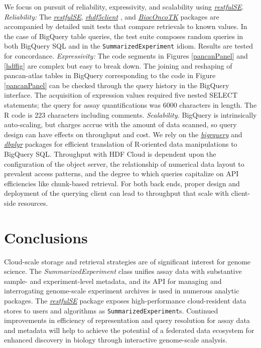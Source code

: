 \documentclass[applications]{gen-bioinformatics}
\newcommand{\Biocpackage}[1]{{\emph{\href{https://bioconductor.org/packages/3.8/#1}{#1}}}}
\newcommand{\CRANpackage}[1]{{\emph{\href{https://cran.r-project.org/web/packages/#1/index.html}{#1}}}}
\newcommand{\Rclass}[1]{{\textit{#1}}}
\begin{document}
We focus on pursuit of reliability,
expressivity, and scalability using \Biocpackage{restfulSE}.  
\textit{Reliability:} 
The \Biocpackage{restfulSE}, \Biocpackage{rhdf5client} \citep{rclient},
and \Biocpackage{BiocOncoTK} \citep{bionc} packages are accompanied by detailed unit
tests that compare retrievals to known values.  In the
case of BigQuery table queries, the test
suite composes random queries 
in both BigQuery SQL and in the \texttt{SummarizedExperiment} 
idiom.  Results
are tested for concordance.  \textit{Expressivity:} The code
segments in Figures \ref{pancanPanel} and \ref{hdffig} are
complex but easy to break down.  The joining and
reshaping of pancan-atlas tables in BigQuery corresponding
to the code in Figure \ref{pancanPanel}
can be checked through the query history in the BigQuery
interface.  The acquisition of expression values required
five nested SELECT statements; the query for assay quantifications
was 6000 characters in length.
The R code is 223 characters including comments.
\textit{Scalability.}  BigQuery is intrinsically auto-scaling,
but charges accrue with the amount of data scanned, 
so query design can have effects on throughput
and cost.  We rely on the \CRANpackage{bigrquery} \citep{bigr} and \CRANpackage{dbplyr} \citep{dbp}packages for
efficient translation of R-oriented data manipulations to 
BigQuery SQL.  Throughput with HDF Cloud 
is dependent upon the configuration of the object server,
the relationship of numerical data layout to prevalent access
patterns, and the degree to which queries capitalize on
API efficiencies like chunk-based retrieval.  For both
back ends, proper design and deployment of the querying client can
lead to throughput that scale with client-side resources.

\section*{Conclusions}

Cloud-scale storage and retrieval strategies are of significant
interest for genome science.  The \Rclass{SummarizedExperiment} class
unifies assay data with substantive sample- and experiment-level
metadata, and its API for managing and interrogating
genome-scale experiment archives is used in numerous
analytic packages.  The \Biocpackage{restfulSE} package exposes high-performance
cloud-resident data stores to users and
algorithms as \verb+SummarizedExperiment+s.  Continued improvements
in efficiency of
representation and query resolution for assay data and metadata
will help to achieve the potential of a federated data ecosystem for
enhanced discovery in biology through interactive genome-scale analysis.
\end{document}
